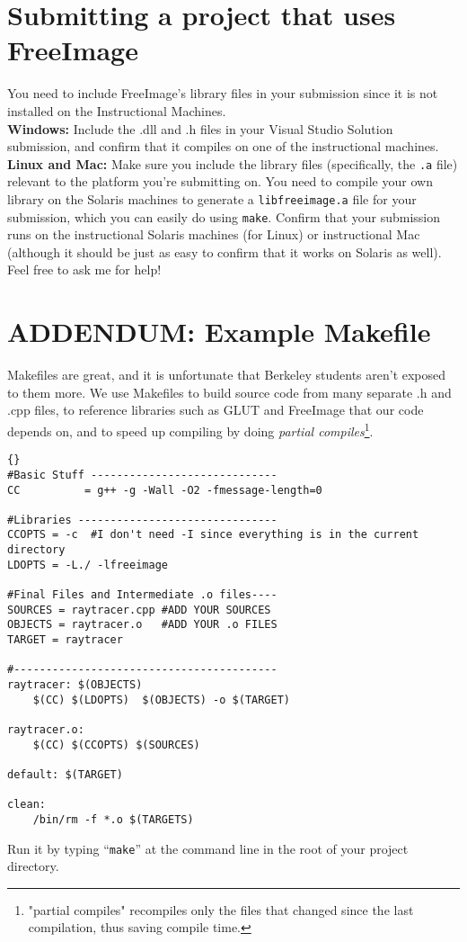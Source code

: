 \documentclass[]{article}
\begin{document}
\pagebreak

\section{Submitting a project that uses FreeImage}

You need to include FreeImage's library files in your submission since it is not installed on the Instructional Machines.\\

\textbf{Windows:} Include the .dll and .h files in your Visual Studio Solution submission, and confirm that it compiles on one of the instructional machines.\\

\textbf{Linux and Mac:} Make sure you include the library files (specifically, the \verb=.a= file) relevant to the platform you're submitting on. You need to compile your own library on the Solaris machines to generate a \verb=libfreeimage.a= file for your submission, which you can easily do using \verb=make=. Confirm that your submission runs on the instructional Solaris machines (for Linux) or instructional Mac (although it should be just as easy to confirm that it works on Solaris as well). Feel free to ask me for help! 

\section{ADDENDUM: Example Makefile}\label{exmake}

Makefiles are great, and it is unfortunate that Berkeley students aren't exposed to them more. We use Makefiles to build source code from many separate .h and .cpp files, to reference libraries such as GLUT and FreeImage that our code depends on, and to speed up compiling by doing {\it partial compiles}\footnote{"partial compiles" recompiles only the files that changed since the last compilation, thus saving compile time.}.

\lstset{language=make}
\lstset{commentstyle=\textit}
\begin{lstlisting}[frame=TRBL,caption=Sample Makefile,label=lstMakefile]{}
#Basic Stuff -----------------------------
CC          = g++ -g -Wall -O2 -fmessage-length=0

#Libraries -------------------------------
CCOPTS = -c  #I don't need -I since everything is in the current directory
LDOPTS = -L./ -lfreeimage

#Final Files and Intermediate .o files----
SOURCES = raytracer.cpp #ADD YOUR SOURCES
OBJECTS = raytracer.o   #ADD YOUR .o FILES
TARGET = raytracer

#-----------------------------------------
raytracer: $(OBJECTS)
	$(CC) $(LDOPTS)  $(OBJECTS) -o $(TARGET)
	
raytracer.o: 
	$(CC) $(CCOPTS) $(SOURCES)  
	
default: $(TARGET)

clean:
	/bin/rm -f *.o $(TARGETS)
\end{lstlisting}

Run it by typing ``\verb=make='' at the command line in the root of your project directory.
\end{document}
